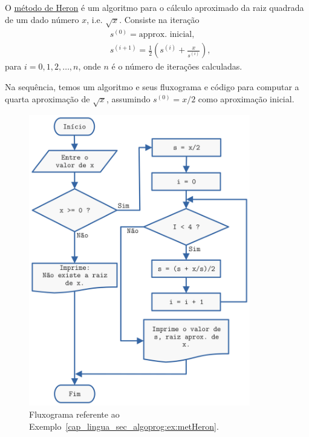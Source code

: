 \begin{ex}\label{cap_lingua_sec_algoprog:ex:metHeron}
  O \href{https://en.wikipedia.org/wiki/Methods_of_computing_square_roots#Heron's_method}{método de Heron}{\heron} é um algoritmo para o cálculo aproximado da raiz quadrada de um dado número $x$, i.e. $\sqrt{x}$. Consiste na iteração
  \begin{align}
    & s^{(0)} = \text{approx. inicial},\\
    & s^{(i+1)} = \frac{1}{2}\left(s^{(i)} + \frac{x}{s^{(i)}}\right),
  \end{align}
  para $i=0,1,2,\ldots,n$, onde $n$ é o número de iterações calculadas.

  Na sequência, temos um algoritmo e seus fluxograma e código {\python} para computar a quarta aproximação de $\sqrt{x}$, assumindo $s^{(0)} = x/2$ como aproximação inicial.

  \begin{figure}[ht]
    \centering
    \includegraphics[height=5in]{./cap_lingua/dados/fig_fluxograma/fig.png}
    \caption{Fluxograma referente ao Exemplo~\ref{cap_lingua_sec_algoprog:ex:metHeron}.}
    \label{cap_lingua_sec_algoprog:fig:metHeron}
  \end{figure}


\end{ex}
